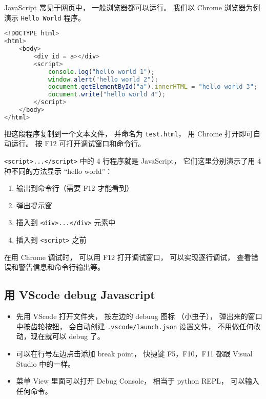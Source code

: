 
JavaScript 常见于网页中， 一般浏览器都可以运行。 我们以 Chrome 浏览器为例演示 \verb|Hello World| 程序。

\begin{lstlisting}[language=js]
<!DOCTYPE html>
<html>
	<body>
		<div id = a></div>
		<script>
            console.log("hello world 1");
            window.alert("hello world 2");
			document.getElementById("a").innerHTML = "hello world 3";
            document.write("hello world 4");
		</script>
	</body>
</html>
\end{lstlisting}
把这段程序复制到一个文本文件， 并命名为 \verb|test.html|， 用 Chrome 打开即可自动运行。 按 F12 可打开调试窗口和命令行。

\verb|<script>...</script>| 中的 4 行程序就是 JavaScript， 它们这里分别演示了用 4 种不同的方法显示 “hello world”：
\begin{enumerate}
\item 输出到命令行（需要 F12 才能看到）
\item 弹出提示窗
\item 插入到 \verb|<div>...</div>| 元素中
\item 插入到 \verb|<script>| 之前
\end{enumerate}

在用 Chrome 调试时， 可以用 F12 打开调试窗口， 可以实现逐行调试， 查看错误和警告信息和命令行输出等。

\subsection{用 VScode debug  Javascript}
\begin{itemize}
\item 先用 VScode 打开文件夹， 按左边的 debuug 图标 （小虫子）， 弹出来的窗口中按齿轮按钮， 会自动创建 \verb`.vscode/launch.json` 设置文件， 不用做任何改动，现在就可以 debug 了。
\item 可以在行号左边点击添加 break point， 快捷键 F5，F10，F11 都跟 Visual Studio 中的一样。
\item 菜单 View 里面可以打开 Debug Console， 相当于 python REPL， 可以输入任何命令。
\end{itemize}

